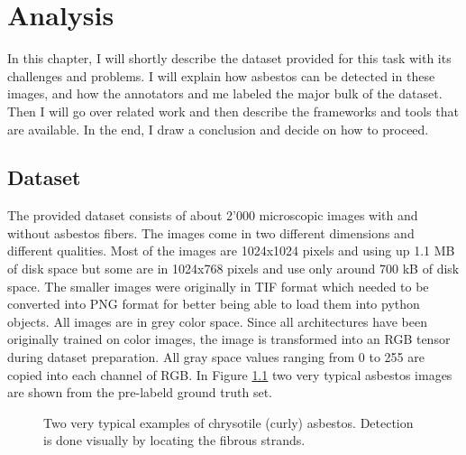 \chapter{Analysis}

In this chapter, I will shortly describe the dataset provided for this task with its challenges and problems. I will explain how asbestos can be detected in these images, and how the annotators and me labeled the major bulk of the dataset. Then I will go over related work and then describe the frameworks and tools that are available. In the end, I draw a conclusion and decide on how to proceed.

\section{Dataset}

The provided dataset consists of about 2'000 microscopic images with and without asbestos fibers. The images come in two different dimensions and different qualities. Most of the images are 1024x1024 pixels and using up 1.1 MB of disk space but some are in 1024x768 pixels and use only around 700 kB of disk space. The smaller images were originally in TIF format which needed to be converted into PNG format for better being able to load them into python objects. All images are in grey color space. Since all architectures have been originally trained on color images, the image is transformed into an RGB tensor during dataset preparation. All gray space values ranging from 0 to 255 are copied into each channel of RGB. In Figure \ref{fig:chrysotile_classification} two very typical asbestos images are shown from the pre-labeld ground truth set.

\begin{figure}[h]
\centering
\caption{Two very typical examples of chrysotile (curly) asbestos. Detection is done visually by locating the fibrous strands.}
\label{fig:chrysotile_classification}
\end{figure}

